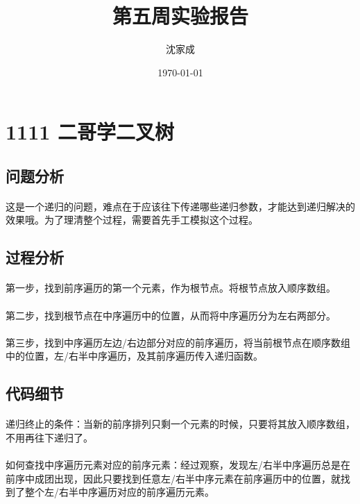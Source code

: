 \documentclass[UTF-8, 12pt]{ctexart}
\title{第五周实验报告}
\author{沈家成}
\date{\today}
\begin{document}
\maketitle
\section{1111 二哥学二叉树}
    \subsection{问题分析}
    \paragraph{}
    这是一个递归的问题，难点在于应该往下传递哪些递归参数，才能达到递归解决的效果哦。为了理清整个过程，需要首先手工模拟这个过程。
    
    \subsection{过程分析}
    \paragraph{}
    第一步，找到前序遍历的第一个元素，作为根节点。将根节点放入顺序数组。
    \paragraph{}
    第二步，找到根节点在中序遍历中的位置，从而将中序遍历分为左右两部分。
    \paragraph{}
    第三步，找到中序遍历左边/右边部分对应的前序遍历，将当前根节点在顺序数组中的位置，左/右半中序遍历，及其前序遍历传入递归函数。
    
    \subsection{代码细节}
    \paragraph{}
    递归终止的条件：当新的前序排列只剩一个元素的时候，只要将其放入顺序数组，不用再往下递归了。
    \paragraph{}
    如何查找中序遍历元素对应的前序元素：经过观察，发现左/右半中序遍历总是在前序中成团出现，因此只要找到任意左/右半中序元素在前序遍历中的位置，就找到了整个左/右半中序遍历对应的前序遍历元素。
\end{document}
